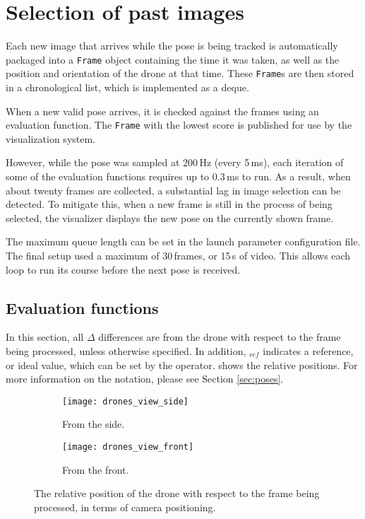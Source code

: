 \chapter{Selection of past images}
    Each new image that arrives while the pose is being tracked is automatically packaged into a \texttt{Frame} object containing the time it was taken, as well as the position and orientation of the drone at that time.
    These \texttt{Frame}s are then stored in a chronological list, which is implemented as a deque.

    When a new valid pose arrives, it is checked against the frames using an evaluation function.
    The \texttt{Frame} with the lowest score is published for use by the visualization system.

    However, while the pose was sampled at 200\,Hz (every 5\,ms), each iteration of some of the evaluation functions requires up to 0.3\,ms to run.
    As a result, when about twenty frames are collected, a substantial lag in image selection can be detected.
    To mitigate this, when a new frame is still in the process of being selected, the visualizer displays the new pose on the currently shown frame.

    The maximum queue length can be set in the launch parameter configuration file.
    The final setup used a maximum of 30\,frames, or 15\,s of video.
    This allows each loop to run its course before the next pose is received.

  \section{Evaluation functions}
    In this section, all $\Delta$ differences are from the drone with respect to the frame being processed, unless otherwise specified.
    In addition, $_{ref}$ indicates a reference, or ideal value, which can be set by the operator.
     shows the relative positions. For more information on the notation, please see Section \ref{sec:poses}.

    \begin{figure}[h]
      \centering
      \begin{subfigure}[b]{0.45\textwidth}
	\texttt{[image: drones\_view\_side]}
	\caption{From the side.}
      \end{subfigure}
      \hfill
      \begin{subfigure}[b]{0.45\textwidth}
	\texttt{[image: drones\_view\_front]}
	\caption{From the front.}
      \end{subfigure}
      \caption[Relative positions]{The relative position of the drone with respect to the frame being processed, in terms of camera positioning.}
      \label{fig:drones_view}
    \end{figure}

